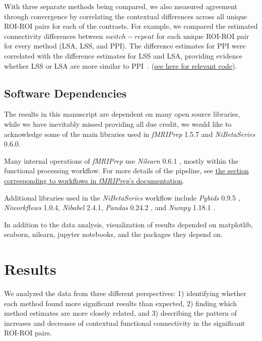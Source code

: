 \documentclass[phd,appendix,figures]{uithesis}
\begin{document}
With three separate methods being compared, we also measured agreement through convergence by correlating the
contextual differences across all unique ROI-ROI pairs for each of the contrasts.
For example, we compared the estimated connectivity differences between $switch - repeat$ for each unique
ROI-ROI pair for every method (LSA, LSS, and PPI).
The difference estimates for PPI were correlated with the difference estimates for LSS and LSA, providing
evidence whether LSS or LSA are more similar to PPI~\cite{Steiger1980}.
(\href{https://github.com/jdkent/BetaSeriesRealDataAnalysis/blob/2e5d7d2443795133770383daaa401cf70cc03f29/PPITest/compare_bsc_ppi.ipynb}{see here for relevant code}).

\subsection*{Software Dependencies}
\label{methods:software-dependencies}

The results in this manuscript are dependent on many open source
libraries, while we have inevitably missed providing all due credit,
we would like to acknowledge some of the main libraries used in 
\emph{fMRIPrep} 1.5.7\cite{fmriprep1} and \emph{NiBetaSeries} 0.6.0\cite{Kent2018}.

Many internal operations of \emph{fMRIPrep} use \emph{Nilearn} 0.6.1
\cite[RRID:SCR\_001362]{nilearn}, mostly within the functional
processing workflow. For more details of the pipeline, see
\href{https://fmriprep.readthedocs.io/en/latest/workflows.html}{the
section corresponding to workflows in \emph{fMRIPrep}'s documentation}.

Additional libraries used in the \emph{NiBetaSeries} workflow include
\emph{Pybids} 0.9.5 \cite{Yarkoni2019}, \emph{Niworkflows} 1.0.4,
\emph{Nibabel} 2.4.1, \emph{Pandas} 0.24.2 \cite{McKinney2010}, and
\emph{Numpy} 1.18.1 \cite{VanDerWalt2011, Oliphant2006}.

In addition to the data analysis, visualization of results depended
on matplotlib\cite{Hunter2007}, seaborn\cite{Waskom2020}, nilearn,
jupyter notebooks\cite{Kluyver2016a}, and the packages they depend on.

\section{Results}
We analyzed the data from three different perspectives:
1) identifying whether each method found more significant results than expected,
2) finding which method estimates are more closely related, and
3) describing the pattern of increases and decreases of contextual functional connectivity
   in the significant ROI-ROI pairs.
\end{document}

